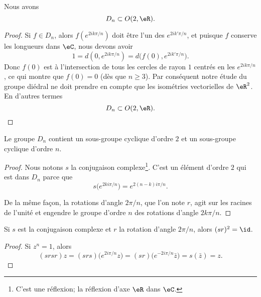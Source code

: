 \begin{lemma}       \label{LEMooCUVPooMZKnzo}
	Nous avons
	\begin{equation}
		D_n\subset O(2,\eR).
	\end{equation}
\end{lemma}

\begin{proof}
	Si \( f\in D_n\), alors \( f( e^{2ik\pi/n}) \) doit être l'un des \(  e^{2ik'\pi/n}\), et puisque \( f\) conserve les longueurs dans \( \eC\), nous devons avoir
	\begin{equation}
		1=d(0, e^{2ik\pi/n})=d\big( f(0), e^{2ik'\pi/n} \big).
	\end{equation}
	Donc \( f(0)\) est à l'intersection de tous les cercles de rayon \( 1\) centrés en les \(  e^{2ik\pi/n}\), ce qui montre que \( f(0)=0\) (dès que \( n\geq 3\)). Par conséquent notre étude du groupe diédral ne doit prendre en compte que les isométries vectorielles de \( \eR^2\). En d'autres termes
	\begin{equation}
		D_n\subset O(2,\eR).
	\end{equation}
\end{proof}

\begin{proposition}      \label{PROPooELOIooVJtuZN}
	Le groupe \( D_n\) contient un sous-groupe cyclique d'ordre \( 2\) et un sous-groupe cyclique d'ordre \( n\).
\end{proposition}

\begin{proof}
	Nous notons \( s\) la conjugaison complexe\footnote{C'est une réflexion; la réflexion d'axe \( \eR\) dans \( \eC\).}. C'est un élément d'ordre \( 2\) qui est dans \( D_n\) parce que
	\begin{equation}    \label{EqSUshknP}
		s\big(  e^{2ki\pi/n} \big)= e^{2(n-k)i\pi/n}.
	\end{equation}

	De la même façon, la rotations d'angle \(2\pi/n\), que l'on note \( r\), agit sur les racines de l'unité et engendre le groupe d'ordre \( n\) des rotations d'angle \(2 k\pi/n\).
\end{proof}

\begin{proposition}
	Si \( s\) est la conjugaison complexe et \( r\) la rotation d'angle \( 2\pi/n\), alors \( (sr)^2=\id\).
\end{proposition}

\begin{proof}
	Si \( z^n=1\), alors
	\begin{equation}
        (srsr)z=(srs)\big(  e^{2 i\pi/n}z \big)=(sr)\big(  e^{-2i\pi /n}\bar z \big)=s(\bar z)=z.
	\end{equation}
\end{proof}

